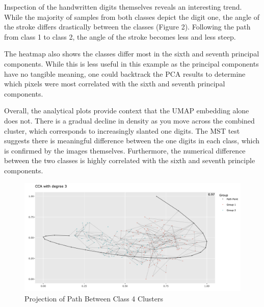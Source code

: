 \documentclass{article}
\begin{document}
Inspection of the handwritten digits themselves reveals an interesting trend. While the majority of samples from both classes depict the digit one, the angle of the stroke differs drastically between the classes (Figure 2). Following the path from class 1 to class 2, the angle of the stroke becomes less and less steep.

The heatmap also shows the classes differ most in the sixth and seventh principal components. While this is less useful in this example as the principal components have no tangible meaning, one could backtrack the PCA results to determine which pixels were most correlated with the sixth and seventh principal components.

Overall, the analytical plots provide context that the UMAP embedding alone does not. There is a gradual decline in density as you move across the combined cluster, which corresponds to increasingly slanted one digits. The MST test suggests there is meaningful difference between the one digits in each class, which is confirmed by the images themselves. Furthermore, the numerical difference between the two classes is highly correlated with the sixth and seventh principle components.

\renewcommand{\figurename}{Figure}
\renewcommand{\thefigure}{4}
\begin{figure}[!b]
\centering
\includegraphics[scale=0.35]{class 4 projection}
\caption{Projection of Path Between Class 4 Clusters}
\end{figure}
\end{document}
